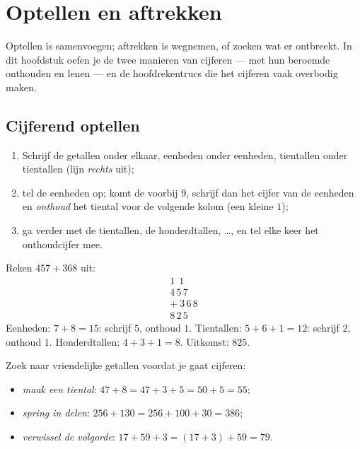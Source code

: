 \chapter{Optellen en aftrekken}\label{ch:g3:addsub}

Optellen is samenvoegen; aftrekken is wegnemen, of zoeken wat er
ontbreekt. In dit hoofdstuk oefen je de twee manieren van cijferen ---
met hun beroemde onthouden en lenen --- en de hoofdrekentrucs die het
cijferen vaak overbodig maken.

\section{Cijferend optellen}

\begin{method}\label{met:g3:addsub:add}
\begin{enumerate}
  \item Schrijf de getallen onder elkaar, eenheden onder eenheden,
        tientallen onder tientallen (lijn \emph{rechts} uit);
  \item tel de eenheden op; komt de  voorbij $9$, schrijf dan het
        cijfer van de eenheden en \emph{onthoud} het tiental voor de
        volgende kolom (een kleine $1$);
  \item ga verder met de tientallen, de honderdtallen, \dots, en tel
        elke keer het onthoudcijfer mee.
\end{enumerate}
\end{method}

\begin{example}\label{ex:g3:addsub:add}
Reken $457 + 368$ uit:
\[
\begin{array}{r}
{\scriptstyle 1}\ \ {\scriptstyle 1}\ \ \phantom{0} \\[-3pt]
4\,5\,7 \\
+\ 3\,6\,8 \\
\hline
8\,2\,5
\end{array}
\]
Eenheden: $7 + 8 = 15$: schrijf $5$, onthoud $1$. Tientallen:
$5 + 6 + 1 = 12$: schrijf $2$, onthoud $1$. Honderdtallen:
$4 + 3 + 1 = 8$. Uitkomst: $825$.
\end{example}

\begin{example}\label{ex:g3:addsub:mental}
Zoek naar vriendelijke getallen voordat je gaat cijferen:
\begin{itemize}
  \item \emph{maak een tiental}: $47 + 8 = 47 + 3 + 5 = 50 + 5 = 55$;
  \item \emph{spring in delen}: $256 + 130 = 256 + 100 + 30 = 386$;
  \item \emph{verwissel de volgorde}: $17 + 59 + 3 = (17 + 3) + 59 = 79$.
\end{itemize}
\end{example}

